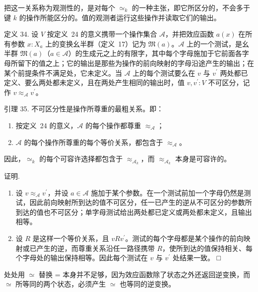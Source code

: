 \documentclass[
  10
]{article}
\begin{document}
把这一关系称为观测性的，是对每个 \(\simeq _ { k }\) 的一种主张，即它所区分的，不会多于键 \(k\) 的操作所能区分的。值的观测者运行这些操作并读取它们的输出。

定义 34. 设 \(V\) 按定义~24 的意义携带一个操作集合 \(\mathcal{A}\)，并把效应函数 \(a ( x )\) 在所有参数 \(x : X _ { a }\) 上的变换幺半群（定义~17）记为 \(\mathfrak { M } ( a )\)。\(\mathcal{A}\) 上的一个测试，是幺半群 \(\mathfrak { M } ( a )\)（\(a \in \mathcal { A }\)）的生成元之上的有限字，其中每个字母施加于它前面各字母所留下的值之上；它的输出是那些为操作的前向映射的字母沿途产生的输出；在某个前提条件不满足处，它未定义。当 \(\mathcal{A}\) 上的每个测试要么在 \(v\) 与 \(v ^ { \prime }\) 两处都已定义、要么两处都未定义，且在两处产生相同的输出时，值 \(v , v ^ { \prime } : V\) 不可区分，记作 \(v \approx _ { \mathcal { A } } v ^ { \prime }\)。

引理 35. 不可区分性是操作所尊重的最粗关系。即：

\begin{enumerate}
\def\labelenumi{\arabic{enumi}.}
\item
  按定义~24 的意义，\(\mathcal{A}\) 的每个操作都尊重 \(\approx _ { \mathcal { A } }\)；
\item
  \(\mathcal{A}\) 的每个操作所尊重的每个等价关系，都包含于 \(\approx _ { \mathcal { A } }\)。
\end{enumerate}

因此，\(\simeq _ { k }\) 的每个可容许选择都包含于 \(\approx _ { \mathcal { A } _ { k } }\)，而 \(\approx _ { \mathcal { A } _ { k } }\) 本身是可容许的。

证明.

\begin{enumerate}
\def\labelenumi{\arabic{enumi}.}
\item
  设 \(v \approx _ { \mathcal { A } } v ^ { \prime }\)，并设 \(a \in \mathcal { A }\) 施加于某个参数。在一个测试前加一个字母仍然是测试，因此前向映射所到达的值不可区分，任一已产生的逆从不可区分的参数所到达的值也不可区分；单字母测试给出两处都已定义或两处都未定义，且输出相等。
\item
  设 \(R\) 是这样一个等价关系，且 \(v R v ^ { \prime }\)。测试的每个字母都是某个操作的前向映射或已产生的逆，而尊重关系沿任一路径携带 \(R\)，使所到达的值保持相关、每个字母处的输出保持相等。因此每个测试在 \(v\) 与 \(v ^ { \prime }\) 处结果一致。 □
\end{enumerate}

处处用 $\simeq$ 替换 = 本身并不足够，因为效应函数除了状态之外还返回逆变换，而 $\simeq$ 所等同的两个状态，必须产生 $\simeq$ 也等同的逆变换。
\end{document}
